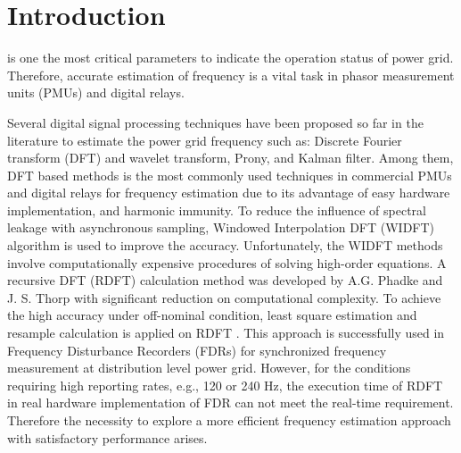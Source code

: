 \documentclass[journal,twoside]{IEEEtran}
\begin{document}
\section{Introduction}
% 
% 
% 
% 

 is one the most critical parameters to indicate the operation status of  power grid. Therefore, accurate  estimation of  frequency is a vital task in phasor measurement units (PMUs) and digital relays.

Several digital signal processing  techniques have been proposed so far in the literature to estimate the power grid frequency such as: Discrete Fourier transform (DFT) \cite{7438889} and wavelet transform\cite{7981350}, Prony\cite{8263521}, and  Kalman filter\cite{Bagheri2016}.
Among them, DFT based methods is the most commonly
used techniques in commercial PMUs  and digital relays for frequency estimation due to its advantage of easy hardware implementation, and harmonic immunity. To reduce the influence of spectral leakage with asynchronous sampling, Windowed Interpolation DFT (WIDFT) algorithm is used to improve the  accuracy\cite{4956674}.
Unfortunately, the WIDFT methods involve computationally expensive procedures of solving high-order equations.
A recursive DFT (RDFT) calculation method was developed by A.G. Phadke and J. S. Thorp with significant reduction on computational complexity\cite{5519136}. To achieve the high accuracy under  off-nominal condition, least square estimation and resample calculation is applied on RDFT \cite{chenjian}. This approach is successfully used in  Frequency Disturbance
Recorders (FDRs) for synchronized frequency measurement at distribution level power grid\cite{7265090}. However, for the conditions requiring high
reporting rates, e.g., 120 or 240 Hz, the execution time of RDFT in real hardware implementation  of FDR can not meet the real-time requirement. Therefore the necessity to explore a more efficient frequency estimation approach with   satisfactory performance arises.
\end{document}
